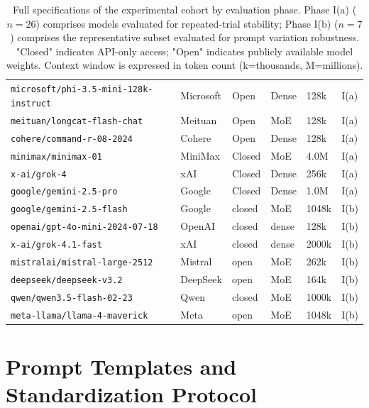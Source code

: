 \documentclass[11pt]{article}
\begin{document}
\begin{table}[t!]
\begin{tabular}{l l l l l l}
\texttt{microsoft/phi-3.5-mini-128k-instruct} & Microsoft & Open & Dense & 128k & I(a) \\
\texttt{meituan/longcat-flash-chat} & Meituan & Open & MoE & 128k & I(a) \\
\texttt{cohere/command-r-08-2024} & Cohere & Open & Dense & 128k & I(a) \\
\texttt{minimax/minimax-01} & MiniMax & Closed & MoE & 4.0M & I(a) \\
\texttt{x-ai/grok-4} & xAI & Closed & Dense & 256k & I(a) \\
\texttt{google/gemini-2.5-pro} & Google & Closed & Dense & 1.0M & I(a) \\
\texttt{google/gemini-2.5-flash} & Google & closed & MoE & 1048k & I(b) \\
\texttt{openai/gpt-4o-mini-2024-07-18} & OpenAI & closed & dense & 128k & I(b) \\
\texttt{x-ai/grok-4.1-fast} & xAI & closed & dense & 2000k & I(b) \\
\texttt{mistralai/mistral-large-2512} & Mistral & open & MoE & 262k & I(b) \\
\texttt{deepseek/deepseek-v3.2} & DeepSeek & open & MoE & 164k & I(b) \\
\texttt{qwen/qwen3.5-flash-02-23} & Qwen & closed & MoE & 1000k & I(b) \\
\texttt{meta-llama/llama-4-maverick} & Meta & open & MoE & 1048k & I(b) \\
\bottomrule
\end{tabular}
\caption{Full specifications of the experimental cohort by evaluation phase. Phase I(a) ($n=26$) comprises models evaluated for repeated-trial stability; Phase I(b) ($n=7$) comprises the representative subset evaluated for prompt variation robustness. "Closed" indicates API-only access; "Open" indicates publicly available model weights. Context window is expressed in token count (k=thousands, M=millions).}
\label{tab:full_models}
\end{table}











\section{Prompt Templates and Standardization Protocol}
\label{sec:appendix-prompts}
\end{document}
